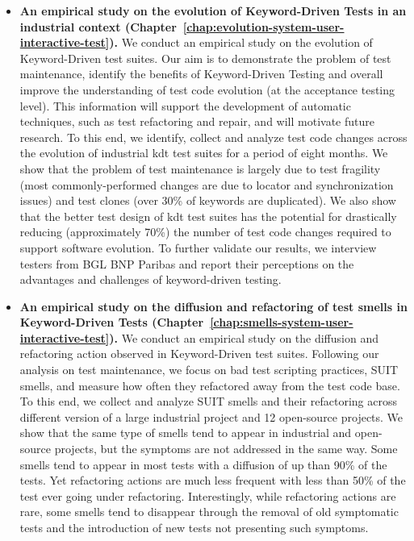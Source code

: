 \begin{itemize}
    \item \textbf{An empirical study on the evolution of Keyword-Driven Tests in an industrial context (Chapter~\ref{chap:evolution-system-user-interactive-test}).} We conduct an empirical study on the evolution of Keyword-Driven test suites. Our aim is to demonstrate the problem of test maintenance, identify the benefits of Keyword-Driven Testing and overall improve the understanding of test code evolution (at the acceptance testing level). This information will support the development of automatic techniques, such as test refactoring and repair, and will motivate future research. To this end, we identify, collect and analyze test code changes across the evolution of industrial \gls{kdt} test suites for a period of eight months. We show that the problem of test maintenance is largely due to test fragility (most commonly-performed changes are due to locator and synchronization issues) and test clones (over 30\% of keywords are duplicated). We also show that the better test design of \gls{kdt} test suites has the potential for drastically reducing (approximately 70\%) the number of test code changes required to support software evolution. To further validate our results, we interview testers from BGL BNP Paribas and report their perceptions on the advantages and challenges of keyword-driven testing. 
    
    \item \textbf{An empirical study on the diffusion and refactoring of test smells in Keyword-Driven Tests (Chapter~\ref{chap:smells-system-user-interactive-test}).} We conduct an empirical study on the diffusion and refactoring action observed in Keyword-Driven test suites. Following our analysis on test maintenance, we focus on bad test scripting practices, SUIT smells, and measure how often they refactored away from the test code base. To this end, we collect and analyze SUIT smells and their refactoring across different version of a large industrial project and 12 open-source projects. We show that the same type of smells tend to appear in industrial and open-source projects, but the symptoms are not addressed in the same way. Some smells tend to appear in most tests with a diffusion of up than 90\% of the tests. Yet refactoring actions are much less frequent with less than 50\% of the test ever going under refactoring. Interestingly,  while refactoring actions are rare, some smells tend to disappear through the removal of old symptomatic tests and the introduction of new tests not presenting such symptoms.
    

\end{itemize}

